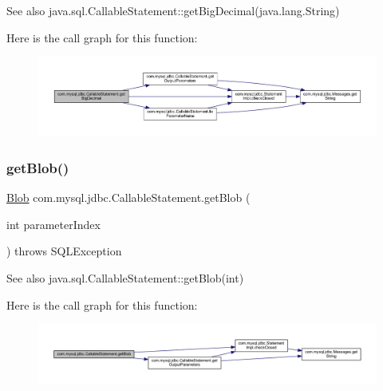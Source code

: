 \begin{DoxySeeAlso}{See also}
java.\+sql.\+Callable\+Statement\+::get\+Big\+Decimal(java.\+lang.\+String) 
\end{DoxySeeAlso}
Here is the call graph for this function\+:\nopagebreak
\begin{figure}[H]
\begin{center}
\leavevmode
\includegraphics[width=350pt]{classcom_1_1mysql_1_1jdbc_1_1_callable_statement_a987a3ccf4e6222eaf783b2b5733c5c9b_cgraph}
\end{center}
\end{figure}
\mbox{\label{classcom_1_1mysql_1_1jdbc_1_1_callable_statement_af8971cdeaf8af8b79c32f871e2a6cfe9}} 
\subsubsection{\texorpdfstring{get\+Blob()}{getBlob()}\hspace{0.1cm}{\footnotesize\ttfamily [1/2]}}
{\footnotesize\ttfamily \mbox{\hyperlink{classcom_1_1mysql_1_1jdbc_1_1_blob}{Blob}} com.\+mysql.\+jdbc.\+Callable\+Statement.\+get\+Blob (\begin{DoxyParamCaption}\item[{int}]{parameter\+Index }\end{DoxyParamCaption}) throws S\+Q\+L\+Exception}

\begin{DoxySeeAlso}{See also}
java.\+sql.\+Callable\+Statement\+::get\+Blob(int) 
\end{DoxySeeAlso}
Here is the call graph for this function\+:\nopagebreak
\begin{figure}[H]
\begin{center}
\leavevmode
\includegraphics[width=350pt]{classcom_1_1mysql_1_1jdbc_1_1_callable_statement_af8971cdeaf8af8b79c32f871e2a6cfe9_cgraph}
\end{center}
\end{figure}
\mbox{\label{classcom_1_1mysql_1_1jdbc_1_1_callable_statement_a6749653815df64cc270f1148ba0ca2bc}} 
